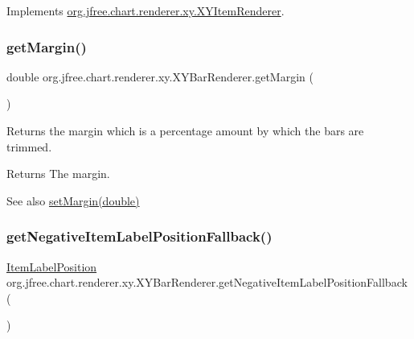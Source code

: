 Implements \mbox{\hyperlink{interfaceorg_1_1jfree_1_1chart_1_1renderer_1_1xy_1_1_x_y_item_renderer_a792c3e8c39bf57711528cd8064d2ddb5}{org.\+jfree.\+chart.\+renderer.\+xy.\+X\+Y\+Item\+Renderer}}.

\mbox{\label{classorg_1_1jfree_1_1chart_1_1renderer_1_1xy_1_1_x_y_bar_renderer_afe1667467a6b42816f9a3bad2373e3b7}} 
\subsubsection{\texorpdfstring{get\+Margin()}{getMargin()}}
{\footnotesize\ttfamily double org.\+jfree.\+chart.\+renderer.\+xy.\+X\+Y\+Bar\+Renderer.\+get\+Margin (\begin{DoxyParamCaption}{ }\end{DoxyParamCaption})}

Returns the margin which is a percentage amount by which the bars are trimmed.

\begin{DoxyReturn}{Returns}
The margin.
\end{DoxyReturn}
\begin{DoxySeeAlso}{See also}
\mbox{\hyperlink{classorg_1_1jfree_1_1chart_1_1renderer_1_1xy_1_1_x_y_bar_renderer_a724b6d3ddd8fd0fe8d389a88c2084b21}{set\+Margin(double)}} 
\end{DoxySeeAlso}
\mbox{\label{classorg_1_1jfree_1_1chart_1_1renderer_1_1xy_1_1_x_y_bar_renderer_a3997bb98cb08e43cf7c36bfd82e9b705}} 
\subsubsection{\texorpdfstring{get\+Negative\+Item\+Label\+Position\+Fallback()}{getNegativeItemLabelPositionFallback()}}
{\footnotesize\ttfamily \mbox{\hyperlink{classorg_1_1jfree_1_1chart_1_1labels_1_1_item_label_position}{Item\+Label\+Position}} org.\+jfree.\+chart.\+renderer.\+xy.\+X\+Y\+Bar\+Renderer.\+get\+Negative\+Item\+Label\+Position\+Fallback (\begin{DoxyParamCaption}{ }\end{DoxyParamCaption})}

